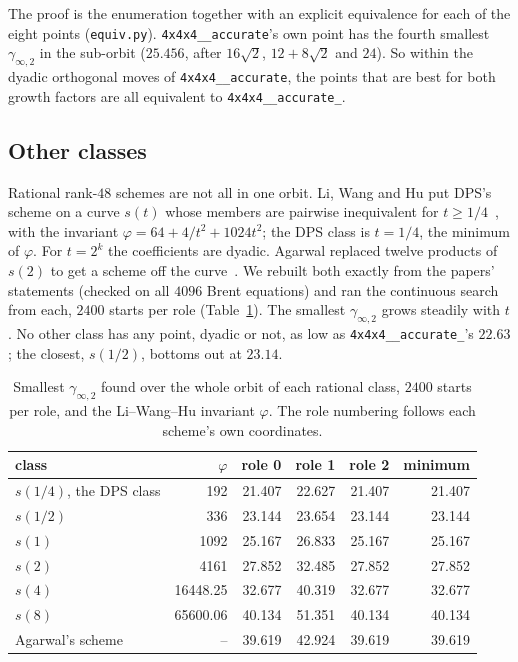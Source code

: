 \documentclass[11pt]{article}
\theoremstyle{remark}
\newcommand{\ginf}{\gamma_{\infty,2}}
\newcommand{\acc}{\texttt{4x4x4\_\allowbreak 48\_\allowbreak accurate}\xspace}
\newcommand{\acct}{\texttt{4x4x4\_\allowbreak 48\_\allowbreak accurate\_\allowbreak 262}\xspace}
\begin{document}
The proof is the enumeration together with an explicit equivalence for
each of the eight points (\texttt{equiv.py}).  \acc's own point has
the fourth smallest $\ginf$ in the sub-orbit ($25.456$, after $16\sqrt2$,
$12+8\sqrt2$ and $24$).  So within the dyadic orthogonal moves of
\acc, the points that are best for both growth factors are all
equivalent to \acct.

\subsection{Other classes}\label{sec:classes}

Rational rank-$48$ schemes are not all in one orbit.  Li, Wang and Hu
put DPS's scheme on a curve $s(t)$ whose members are pairwise
inequivalent for $t\ge1/4$~\cite{LWH26}, with the invariant
$\varphi=64+4/t^2+1024t^2$; the DPS class is $t=1/4$, the minimum of
$\varphi$.  For $t=2^k$ the coefficients are dyadic.  Agarwal replaced
twelve products of $s(2)$ to get a scheme off the curve~\cite{Agarwal26}.
We rebuilt both exactly from the papers' statements (checked on all
$4096$ Brent equations) and ran the continuous search from each,
$2400$ starts per role (Table~\ref{tab:classes}).  The smallest $\ginf$
grows steadily with $t$.  No other class has any point, dyadic or not,
as low as \acct's $22.63$; the closest, $s(1/2)$,
bottoms out at $23.14$.

\begin{table}[t]
\centering
\caption{Smallest $\ginf$ found over the whole orbit of each rational class, $2400$ starts per
role, and the Li--Wang--Hu invariant $\varphi$.  The role numbering follows each scheme's own
coordinates.}
\label{tab:classes}
\small
\begin{tabular}{lrrrrr}
\toprule
class & $\varphi$ & role 0 & role 1 & role 2 & minimum\\
\midrule
$s(1/4)$, the DPS class & 192 & 21.407 & 22.627 & 21.407 & 21.407\\
$s(1/2)$ & 336 & 23.144 & 23.654 & 23.144 & 23.144\\
$s(1)$ & 1092 & 25.167 & 26.833 & 25.167 & 25.167\\
$s(2)$ & 4161 & 27.852 & 32.485 & 27.852 & 27.852\\
$s(4)$ & 16448.25 & 32.677 & 40.319 & 32.677 & 32.677\\
$s(8)$ & 65600.06 & 40.134 & 51.351 & 40.134 & 40.134\\
Agarwal's scheme & -- & 39.619 & 42.924 & 39.619 & 39.619\\
\bottomrule
\end{tabular}
\end{table}
\end{document}
